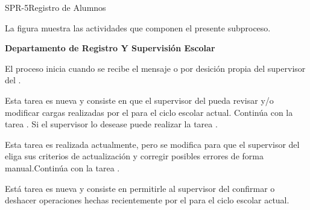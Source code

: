 \begin{Proceso}{SPR-5}{Registro de Alumnos}
{	}
\end{Proceso}

La figura  muestra las actividades que componen el presente subproceso.


\begin{PDescripcion}
	
	\Ppaso  \textbf{Departamento de Registro Y Supervisión Escolar}
	
	\begin{enumerate}
	\Ppaso [\Einicio] El proceso inicia cuando se recibe el mensaje   o por desición propia del supervisor del .
	
	\Ppaso [\itarea]   Esta tarea es nueva y consiste en que el supervisor del  pueda revisar y/o modificar cargas realizadas por el  para el ciclo escolar actual. Continúa con la tarea . Si el supervisor lo desease puede realizar la tarea .
	
	\Ppaso [\itarea]   Esta tarea es realizada actualmente, pero se modifica para que el supervisor del  eliga sus criterios de actualización y corregir posibles errores de forma manual.Continúa con la tarea .
	
	\Ppaso [\itarea] Está tarea es nueva y consiste en permitirle al supervisor del  confirmar o deshacer operaciones hechas recientemente por el  para el ciclo escolar actual.	
		
	\end{enumerate}
	
\end{PDescripcion}


